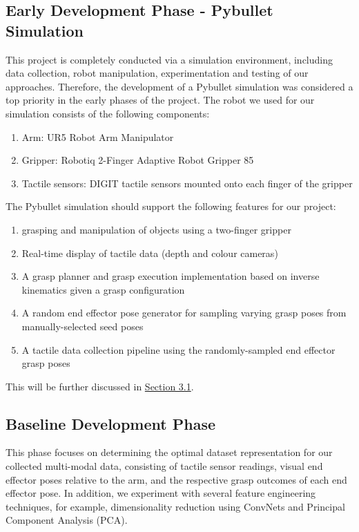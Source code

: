 \documentclass[11pt, a4paper]{report}
\begin{document}
\subsection{Early Development Phase - Pybullet Simulation}\label{sec:1.4.2}
This project is completely conducted via a simulation environment, including data collection, robot manipulation, experimentation and testing of our approaches. Therefore, the development of a Pybullet simulation was considered a top priority in the early phases of the project. The robot we used for our simulation consists of the following components:
\begin{enumerate}
    \item Arm: UR5 Robot Arm Manipulator
    \item Gripper: Robotiq 2-Finger Adaptive Robot Gripper 85
    \item Tactile sensors: DIGIT tactile sensors \cite{Lambeta2020DIGIT} mounted onto each finger of the gripper
\end{enumerate}
The Pybullet simulation should support the following features for our project:
\begin{enumerate}
    \item grasping and manipulation of objects using a two-finger gripper 
    \item Real-time display of tactile data (depth and colour cameras)
    \item A grasp planner and grasp execution implementation based on inverse kinematics given a grasp configuration
    \item A random end effector pose generator for sampling varying grasp poses from manually-selected seed poses
    \item A tactile data collection pipeline using the randomly-sampled end effector grasp poses
\end{enumerate}
\noindent This will be further discussed in \hyperref[sec:3.1]{Section 3.1}.


\subsection{Baseline Development Phase}\label{sec:1.4.3}
This phase focuses on determining the optimal dataset representation for our collected multi-modal data, consisting of tactile sensor readings, visual end effector poses relative to the arm, and the respective grasp outcomes of each end effector pose. In addition, we experiment with several feature engineering techniques, for example, dimensionality reduction using ConvNets and Principal Component Analysis (PCA).
\end{document}
